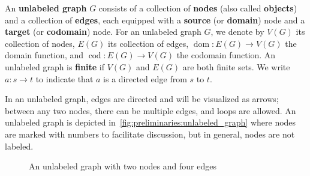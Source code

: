 \begin{definition}
    \label{def:graph:unlabeled}
    An \textbf{unlabeled graph} \( G \) consists of a collection of \textbf{nodes} (also called \textbf{objects}) and a collection of \textbf{edges}, each equipped with a \textbf{source} (or \textbf{domain}) node and a \textbf{target} (or \textbf{codomain}) node. 
    For an unlabeled graph \( G \), we denote by \( V(G) \) its collection of nodes, \( E(G) \) its collection of edges, \( \operatorname{dom}: E(G) {\to}V(G) \) the domain function, and \( \operatorname{cod}:E(G) {\to} V(G) \) the codomain function. An unlabeled graph is \textbf{finite} if \( V(G) \) and \( E(G) \) are both finite sets. 
    We write \( a: s \to t \) to indicate that \( a \) is a directed edge from \( s \) to \( t \).
\end{definition}   

\begin{example}
    In an unlabeled graph, edges are directed and will be visualized as arrows; between any two nodes, there can be multiple edges, and loops are allowed. An unlabeled graph is depicted in~\autoref{fig:preliminaries:unlabeled_graph} where nodes are marked with numbers to facilitate discussion, but in general, nodes are not labeled.
    \begin{figure}[hbtp]
        \centering
    \caption{An unlabeled graph with two nodes and four edges}
    \label{fig:preliminaries:unlabeled_graph}
    \end{figure}
\end{example}